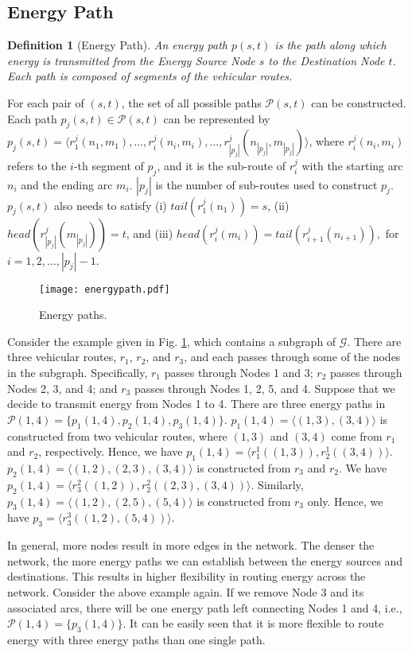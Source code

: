 \documentclass[journal]{IEEEtran}
\newtheorem{definition}{Definition}
\begin{document}
\subsection{Energy Path}
\begin{definition}[Energy Path]
An energy path $p(s,t)$ is the path along which energy is transmitted from the Energy Source Node $s$ to  the Destination Node $t$. Each path is composed of segments of the vehicular routes.
\end{definition}
For each pair of $(s,t)$, the set of all possible paths $\mathcal{P}(s,t)$ can be constructed. Each path $p_j(s,t)\in \mathcal{P}(s,t)$ can be represented by $p_j(s,t)=\langle r_1^j(n_1,m_1),\ldots, r_i^j(n_i,m_i),\ldots, r_{|p_j|}^j(n_{|p_j|},m_{|p_j|}) \rangle$, where $r_i^j(n_i,m_i)$ refers to the $i$-th segment of $p_j$, and it is the sub-route of $r_i^j$ with the starting arc $n_i$ and the ending arc $m_i$. $|p_j|$ is the number of sub-routes used to construct $p_j$. $p_j(s,t)$ also needs to satisfy
(i) $tail(r_1^j(n_1))=s$,
(ii) $head(r_{|p_j|}^j(m_{|p_j|}))=t$, and
(iii) $head(r_{i}^j(m_{i}))=tail(r_{i+1}^j(n_{i+1})),$ for $i=1,2,\ldots,|p_j|-1$.
\begin{figure}[!t]
\centering
\texttt{[image: energypath.pdf]}\vspace{-0.5cm}
\caption{Energy paths.}
\label{fig:energypaths}
\vspace{-0.3cm}
\end{figure}
Consider the example given in Fig. \ref{fig:energypaths}, which contains a subgraph of $\mathcal{G}$.  There are three vehicular routes, $r_1$, $r_2$, and $r_3$, and each passes through some of the nodes in the subgraph. Specifically, $r_1$ passes through Nodes 1 and 3; $r_2$ passes through Nodes 2, 3, and 4; and $r_3$ passes through Nodes 1, 2, 5, and 4. Suppose that we decide to transmit energy from Nodes 1 to 4. There are three energy paths in $\mathcal{P}(1,4)=\{p_1(1,4),p_2(1,4),p_3(1,4)\}$. $p_1(1,4)=\langle (1,3),(3,4)\rangle$ is constructed from two vehicular routes, where $(1,3)$ and $(3,4)$ come from $r_1$ and $r_2$, respectively. Hence, we have $p_1(1,4)=\langle r_1^1((1,3)),r_2^1((3,4))\rangle$.
$p_2(1,4)=\langle (1,2),(2,3),(3,4)\rangle$ is constructed from $r_3$ and $r_2$. We have $p_2(1,4)=\langle r_3^2((1,2)),r_2^2((2,3),(3,4))\rangle$.
Similarly, $p_3(1,4)=\langle (1,2),(2,5),(5,4)\rangle$ is constructed from $r_3$ only. Hence, we have $p_3=\langle r_3^3((1,2),(5,4))\rangle$.

In general, more nodes result in more edges in the network. The denser the network, the more energy paths we can establish between the energy sources and destinations. This results in higher flexibility in routing energy across the network. Consider the above example again. If we remove Node 3 and its associated arcs, there will be one energy path left connecting Nodes 1 and 4, i.e., $\mathcal{P}(1,4)=\{p_3(1,4)\}$. It can be easily seen that it is more flexible to route energy with three energy paths than one single path.  
\end{document}
